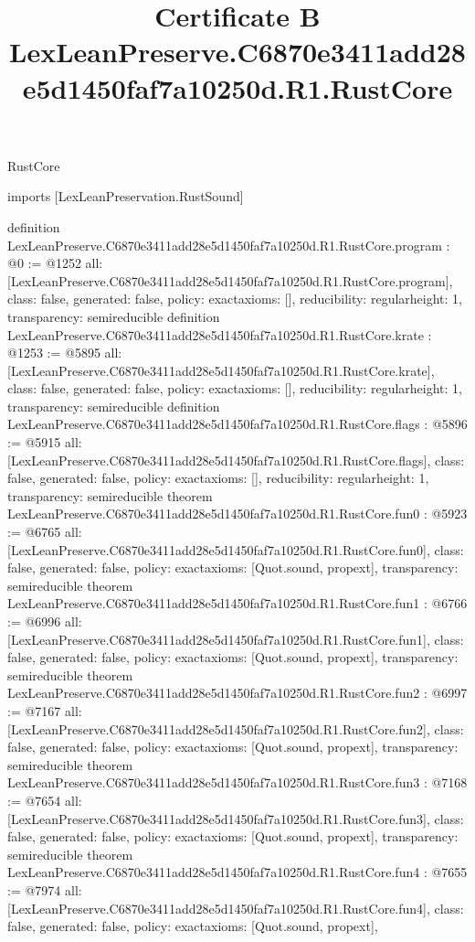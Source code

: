 \begin{lexlean}{RustCore}
\title{Certificate B LexLeanPreserve.C6870e3411add28e5d1450faf7a10250d.R1.RustCore}
\begin{coremodule}
imports [LexLeanPreservation.RustSound]

definition LexLeanPreserve.C6870e3411add28e5d1450faf7a10250d.R1.RustCore.program : @0 := @1252 {
  all: [LexLeanPreserve.C6870e3411add28e5d1450faf7a10250d.R1.RustCore.program],
  class: false,
  generated: false,
  policy: exact{axioms: []},
  reducibility: regular{height: 1},
  transparency: semireducible
}
definition LexLeanPreserve.C6870e3411add28e5d1450faf7a10250d.R1.RustCore.krate : @1253 := @5895 {
  all: [LexLeanPreserve.C6870e3411add28e5d1450faf7a10250d.R1.RustCore.krate],
  class: false,
  generated: false,
  policy: exact{axioms: []},
  reducibility: regular{height: 1},
  transparency: semireducible
}
definition LexLeanPreserve.C6870e3411add28e5d1450faf7a10250d.R1.RustCore.flags : @5896 := @5915 {
  all: [LexLeanPreserve.C6870e3411add28e5d1450faf7a10250d.R1.RustCore.flags],
  class: false,
  generated: false,
  policy: exact{axioms: []},
  reducibility: regular{height: 1},
  transparency: semireducible
}
theorem LexLeanPreserve.C6870e3411add28e5d1450faf7a10250d.R1.RustCore.fun0 : @5923 := @6765 {
  all: [LexLeanPreserve.C6870e3411add28e5d1450faf7a10250d.R1.RustCore.fun0],
  class: false,
  generated: false,
  policy: exact{axioms: [Quot.sound, propext]},
  transparency: semireducible
}
theorem LexLeanPreserve.C6870e3411add28e5d1450faf7a10250d.R1.RustCore.fun1 : @6766 := @6996 {
  all: [LexLeanPreserve.C6870e3411add28e5d1450faf7a10250d.R1.RustCore.fun1],
  class: false,
  generated: false,
  policy: exact{axioms: [Quot.sound, propext]},
  transparency: semireducible
}
theorem LexLeanPreserve.C6870e3411add28e5d1450faf7a10250d.R1.RustCore.fun2 : @6997 := @7167 {
  all: [LexLeanPreserve.C6870e3411add28e5d1450faf7a10250d.R1.RustCore.fun2],
  class: false,
  generated: false,
  policy: exact{axioms: [Quot.sound, propext]},
  transparency: semireducible
}
theorem LexLeanPreserve.C6870e3411add28e5d1450faf7a10250d.R1.RustCore.fun3 : @7168 := @7654 {
  all: [LexLeanPreserve.C6870e3411add28e5d1450faf7a10250d.R1.RustCore.fun3],
  class: false,
  generated: false,
  policy: exact{axioms: [Quot.sound, propext]},
  transparency: semireducible
}
theorem LexLeanPreserve.C6870e3411add28e5d1450faf7a10250d.R1.RustCore.fun4 : @7655 := @7974 {
  all: [LexLeanPreserve.C6870e3411add28e5d1450faf7a10250d.R1.RustCore.fun4],
  class: false,
  generated: false,
  policy: exact{axioms: [Quot.sound, propext]},
}
\end{coremodule}
\end{lexlean}
